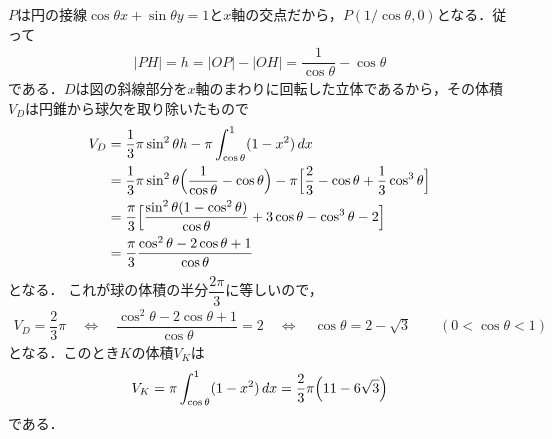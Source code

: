 \documentclass[../../main.tex]{subfiles}
\begin{document}
$P$は円の接線$\cos\theta x+\sin\theta y=1$と$x$軸の交点だから，$P(1/\cos\theta,0)$となる．従って
\begin{align}
  |PH| = h = |OP| - |OH| =\dfrac{1}{\cos\theta}-\cos\theta \label{eq:1}
\end{align}
である．$D$は図の斜線部分を$x$軸のまわりに回転した立体であるから，その体積$V_D$は円錐から球欠を取り除いたもので
\begin{align}
  V_D
  &=\dfrac{1}{3}\pi \sin^2\theta h-\pi\int_{\cos\theta}^{1}(1-x^2)\,dx\\
  &=\dfrac{1}{3}\pi \sin^2\theta \Bigl(\dfrac{1}{\cos\theta}-\cos\theta\Bigr)
  -\pi\Bigl[\dfrac{2}{3}-\cos\theta+\dfrac{1}{3}\cos^3\theta\Bigr]\\
  &=\dfrac{\pi}{3}\Bigl[\dfrac{\sin^2\theta(1-\cos^2\theta)}{\cos\theta}+3\cos\theta-\cos^3\theta-2\Bigr]\\
  &=\dfrac{\pi}{3}\dfrac{\cos^2\theta-2\cos\theta+1}{\cos\theta} \label{eq:2}
\end{align}
となる．
これが球の体積の半分$\dfrac{2\pi}{3}$に等しいので，
\begin{align}
  V_D=\dfrac{2}{3}\pi
  \quad\Longleftrightarrow\quad
  \dfrac{\cos^2\theta-2\cos\theta+1}{\cos\theta}=2
  \quad\Longleftrightarrow\quad
  \cos\theta=2-\sqrt{3}\qquad(0<\cos\theta<1) \label{eq:3}
\end{align}
となる．このとき$K$の体積$V_K$は
\begin{align}
  V_K=\pi\int_{\cos\theta}^{1}(1-x^2)\,dx
  =\dfrac{2}{3}\pi\Bigl(11-6\sqrt{3}\Bigr)
\end{align}
である．

\newpage
\end{document}
